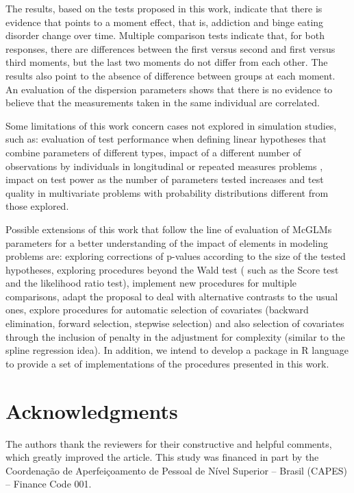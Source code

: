 \documentclass[AMA,STIX1COL]{WileyNJD-v2}
\begin{document}
The results, based on the tests proposed in this work, indicate that there is evidence that points to a moment effect, that is, addiction and binge eating disorder change over time. Multiple comparison tests indicate that, for both responses, there are differences between the first versus second and first versus third moments, but the last two moments do not differ from each other. The results also point to the absence of difference between groups at each moment. An evaluation of the dispersion parameters shows that there is no evidence to believe that the measurements taken in the same individual are correlated.

Some limitations of this work concern cases not explored in simulation studies, such as: evaluation of test performance when defining linear hypotheses that combine parameters of different types, impact of a different number of observations by individuals in longitudinal or repeated measures problems , impact on test power as the number of parameters tested increases and test quality in multivariate problems with probability distributions different from those explored.

Possible extensions of this work that follow the line of evaluation of McGLMs parameters for a better understanding of the impact of elements in modeling problems are: exploring corrections of p-values according to the size of the tested hypotheses, exploring procedures beyond the Wald test ( such as the Score test and the likelihood ratio test), implement new procedures for multiple comparisons, adapt the proposal to deal with alternative contrasts to the usual ones, explore procedures for automatic selection of covariates (backward elimination, forward selection, stepwise selection) and also selection of covariates through the inclusion of penalty in the adjustment for complexity (similar to the spline regression idea). In addition, we intend to develop a package in R language to provide a set of implementations of the procedures presented in this work.



\section*{Acknowledgments}

The authors thank the reviewers for their constructive and helpful comments, which greatly improved the article. This study was financed in part by the Coordenação de Aperfeiçoamento de Pessoal de Nível Superior – Brasil (CAPES) – Finance Code 001.
\end{document}
